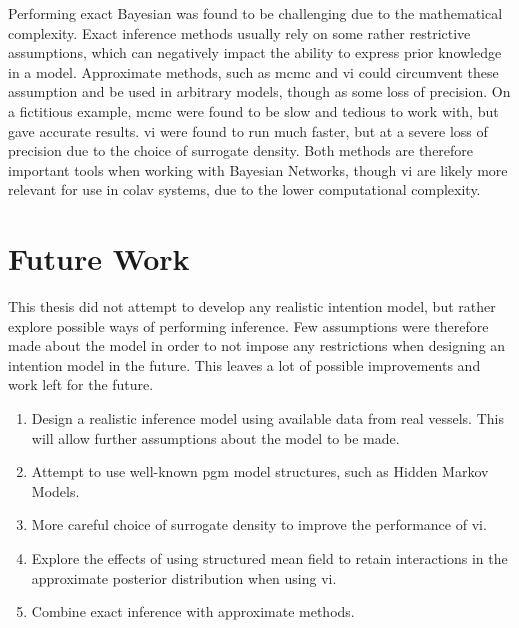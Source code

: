 Performing exact Bayesian was found to be challenging due to the mathematical complexity. Exact inference methods usually rely on some rather restrictive assumptions, which can negatively impact the ability to express prior knowledge in a model. Approximate methods, such as \acrshort{mcmc} and \acrshort{vi} could circumvent these assumption and be used in arbitrary models, though as some loss of precision. On a fictitious example, \acrshort{mcmc} were found to be slow and tedious to work with, but gave accurate results. \acrshort{vi} were found to run much faster, but at a severe loss of precision due to the choice of surrogate density. Both methods are therefore important tools when working with Bayesian Networks, though \acrshort{vi} are likely more relevant for use in \acrshort{colav} systems, due to the lower computational complexity.  

\section{Future Work}
This thesis did not attempt to develop any realistic intention model, but rather explore possible ways of performing inference. Few assumptions were therefore made about the model in order to not impose any restrictions when designing an intention model in the future. This leaves a lot of possible improvements and work left for the future.

\begin{enumerate}
    \item Design a realistic inference model using available data from real vessels. This will allow further assumptions about the model to be made. 
    \item Attempt to use well-known \acrshort{pgm} model structures, such as Hidden Markov Models. 
    \item More careful choice of surrogate density to improve the performance of \acrshort{vi}.
    \item Explore the effects of using structured mean field to retain interactions in the approximate posterior distribution when using \acrshort{vi}. 
    \item Combine exact inference with approximate methods.
\end{enumerate}




